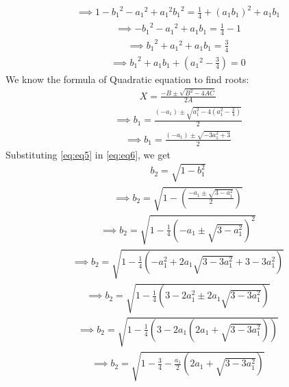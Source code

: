\documentclass[12pt,-letter paper]{article}
\providecommand{\brak}[1]{\ensuremath{\left(#1\right)}}
\providecommand{\brak}[1]{\ensuremath{\left(#1\right)}}
\begin{document}
\begin{enumerate}
\begin{align}
    \end{align}
    \begin{align}
 \implies   {1-{b_1}^2-{a_1}^2+{a_1}^2{b_1}^2} = \frac{1}{4} +(a_1b_1)^2+a_1b_1
    \end{align}
    \begin{align}
   \implies -{b_1}^2-{a_1}^2+{a_1b_1} = \frac{1}{4}-1
    \end{align}
  \begin{align}
  \implies {b_1}^2+{a_1}^2+{a_1b_1}=\frac{3}{4}
  \end{align}
  \begin{align}
 \implies {b_1}^2+{a_1b_1}+\brak{{a_1}^2-\frac{3}{4}}=0
  \end{align}
  We know the formula of Quadratic equation to find roots: 
  \begin{align}
   X = \frac{-B \pm \sqrt{B^2 - 4AC}}{2A}
\end{align} 
\begin{align}
\implies  b_1 = \frac{(-a_1) \pm \sqrt{a_1^2 - 4(a_1^2-\frac{3}{4})}}{2}
  \end{align}  
  \begin{align}
\implies  b_1 = \frac{ (-a_1)\pm \sqrt{-3a_1^2+3}}{2}
\label{eq:eq5}
  \end{align}
  Substituting \eqref{eq:eq5} in \eqref{eq:eq6}, we get
  \begin{align}
b_2=\sqrt{1-b_1^2}
  \end{align}
  \begin{align}
    \implies b_2=\sqrt{1-\brak{\frac{-a_1 \pm \sqrt{3-a_1^2}}{2}}}
    \end{align}
     \begin{align}
 \implies b_2=\sqrt{1-\frac{1}{4}\brak{-a_1 \pm \sqrt{3-a_1^2}}^2}
 \end{align}
 \begin{align}
  \implies b_2= \sqrt{1-\frac{1}{4}\brak{-a_1^2 + 2a_1\sqrt{3-3a_1^2}+3-3a_1^2}}
   \end{align}
   \begin{align}
   \implies  b_2= \sqrt{1-\frac{1}{4}\brak{3-2a_1^2 \pm 2a_1\sqrt{3-3a_1^2}}}
     \end{align}
   \begin{align}
   \implies  b_2= \sqrt{1-\frac{1}{4}\brak{3-2a_1 \brak{2a_1+\sqrt{3-3a_1^2}}}}
   \end{align}
   \begin{align}
   \implies b_2=\sqrt{1-\frac{3}{4}-\frac{a_1}{2}\brak{2a_1 + \sqrt{3-3a_1^2}}}
   \end{align}

\end{enumerate}
\end{document}
